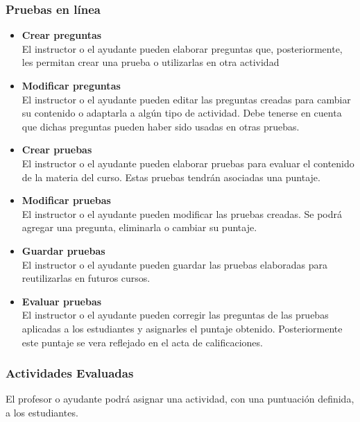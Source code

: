 \subsubsection{Pruebas en línea}
\begin{itemize}
	\item \textbf{Crear preguntas}\\
	El instructor o el ayudante pueden elaborar preguntas que, posteriormente, les permitan crear una prueba o utilizarlas en otra actividad 
	\item \textbf{Modificar preguntas}\\
	El instructor o el ayudante pueden editar las preguntas creadas para cambiar su contenido o adaptarla a algún tipo de actividad. Debe tenerse en cuenta que dichas preguntas pueden haber sido usadas en otras pruebas.
	\item \textbf{Crear pruebas}\\
	El instructor o el ayudante pueden elaborar pruebas para evaluar el contenido de la materia del curso. Estas pruebas tendrán asociadas una puntaje.
	\item \textbf{Modificar pruebas}\\
	El instructor o el ayudante pueden modificar las pruebas creadas. Se podrá agregar una pregunta, eliminarla o cambiar su puntaje.
	\item \textbf{Guardar pruebas}\\
	El instructor o el ayudante pueden guardar las pruebas elaboradas para reutilizarlas en futuros cursos.
	\item \textbf{Evaluar pruebas}\\
	El instructor o el ayudante pueden corregir las preguntas de las pruebas aplicadas a los estudiantes y asignarles el puntaje obtenido. Posteriormente este puntaje se vera reflejado en el acta de calificaciones. 
\end{itemize}

\subsubsection{Actividades Evaluadas}
El profesor o ayudante podrá asignar una actividad, con una puntuación definida, a los estudiantes.

